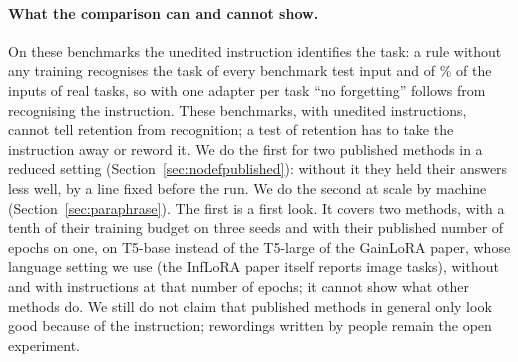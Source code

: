 \paragraph{What the comparison can and cannot show.} On these benchmarks the unedited instruction identifies the task: a rule without any training recognises the task of every benchmark test input and of \ManyNearRightPct{}\% of the inputs of \ManyTasks{} real tasks, so with one adapter per task ``no forgetting'' follows from recognising the instruction. These benchmarks, with unedited instructions, cannot tell retention from recognition; a test of retention has to take the instruction away or reword it. We do the first for two published methods in a reduced setting (Section~\ref{sec:nodefpublished}): without it they held their answers less well, by a line fixed before the run. We do the second at scale by machine (Section~\ref{sec:paraphrase}). The first is a first look. It covers two methods, with a tenth of their training budget on three seeds and with their published number of epochs on one, on T5-base instead of the T5-large of the GainLoRA paper, whose language setting we use (the InfLoRA paper itself reports image tasks), without and with instructions at that number of epochs; it cannot show what other methods do. We still do not claim that published methods in general only look good because of the instruction; rewordings written by people remain the open experiment.

